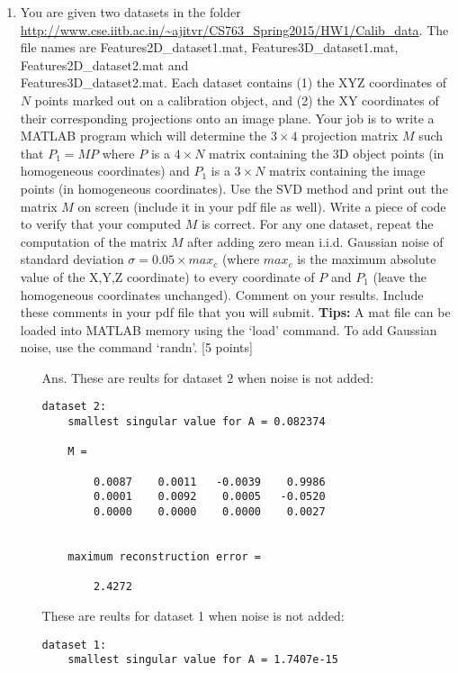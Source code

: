 \documentclass[11pt]{article}
\begin{document}
\begin{enumerate}
\begin{itemize}
	
\end{itemize}



\item You are given two datasets in the folder \url{http://www.cse.iitb.ac.in/~ajitvr/CS763_Spring2015/HW1/Calib_data}. The file names are Features2D\_dataset1.mat, Features3D\_dataset1.mat, Features2D\_dataset2.mat and \\ Features3D\_dataset2.mat. Each dataset contains (1) the XYZ coordinates of $N$ points marked out on a calibration object, and (2) the XY coordinates of their corresponding projections onto an image plane. Your job is to write a MATLAB program which will determine the $3 \times 4$ projection matrix $M$ such that $P_1 = MP$ where $P$ is a $4 \times N$ matrix containing the 3D object points (in homogeneous coordinates) and $P_1$ is a $3 \times N$ matrix containing the image points (in homogeneous coordinates). Use the SVD method and print out the matrix $M$ on screen (include it in your pdf file as well). Write a piece of code to verify that your computed $M$ is correct. For any one dataset, repeat the computation of the matrix $M$ after adding zero mean i.i.d. Gaussian noise of standard deviation $\sigma = 0.05 \times max_c$ (where $max_c$ is the maximum absolute value of the X,Y,Z coordinate) to every coordinate of $P$ and $P_1$ (leave the homogeneous coordinates unchanged). Comment on your results. Include these comments in your pdf file that you will submit. \textbf{Tips:} A mat file can be loaded into MATLAB memory using the `load' command. To add Gaussian noise, use the command `randn'. \textsf{[5 points]}
\begin{itemize}
	\item[Ans.] 
	These are reults for dataset 2 when noise is not added:
	\begin{Verbatim}[frame=single]
	dataset 2: 
	smallest singular value for A = 0.082374

	M =

	    0.0087    0.0011   -0.0039    0.9986
	    0.0001    0.0092    0.0005   -0.0520
	    0.0000    0.0000    0.0000    0.0027


	maximum reconstruction error =

	    2.4272
	\end{Verbatim}

	These are reults for dataset 1 when noise is not added:
	\begin{Verbatim}[frame=single]
	dataset 1: 
	smallest singular value for A = 1.7407e-15


\end{Verbatim}
\end{itemize}
\end{enumerate}
\end{document}
